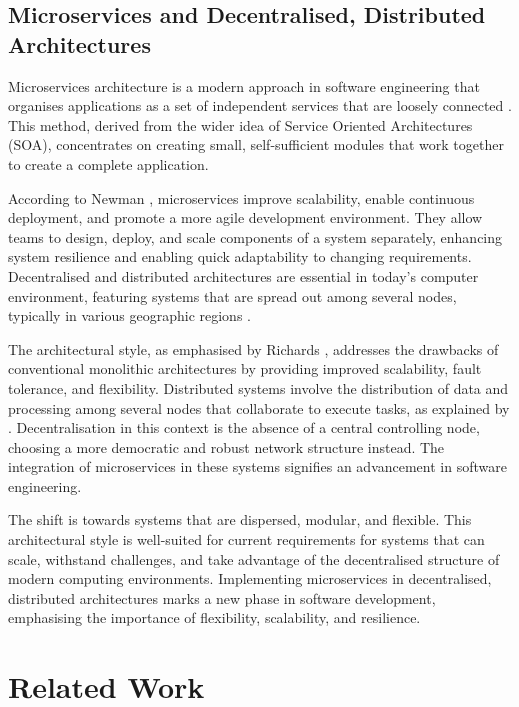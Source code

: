 \documentclass[review]{elsarticle}
\begin{document}
\subsection{Microservices and Decentralised, Distributed Architectures} 

Microservices architecture is a modern approach in software engineering that organises applications as a set of independent services that are loosely connected \cite{bucchiarone2020microservices}. This method, derived from the wider idea of Service Oriented Architectures (SOA), concentrates on creating small, self-sufficient modules that work together to create a complete application. 

According to Newman \cite{newman2021building}, microservices improve scalability, enable continuous deployment, and promote a more agile development environment. They allow teams to design, deploy, and scale components of a system separately, enhancing system resilience and enabling quick adaptability to changing requirements. Decentralised and distributed architectures are essential in today's computer environment, featuring systems that are spread out among several nodes, typically in various geographic regions \cite{ataei2023application}. 

The architectural style, as emphasised by Richards \cite{richardson2018microservices}, addresses the drawbacks of conventional monolithic architectures by providing improved scalability, fault tolerance, and flexibility. Distributed systems involve the distribution of data and processing among several nodes that collaborate to execute tasks, as explained by \cite{Coulouris2005}. Decentralisation in this context is the absence of a central controlling node, choosing a more democratic and robust network structure instead. The integration of microservices in these systems signifies an advancement in software engineering. 

The shift is towards systems that are dispersed, modular, and flexible. This architectural style is well-suited for current requirements for systems that can scale, withstand challenges, and take advantage of the decentralised structure of modern computing environments. Implementing microservices in decentralised, distributed architectures marks a new phase in software development, emphasising the importance of flexibility, scalability, and resilience.

\section{Related Work}
\end{document}
